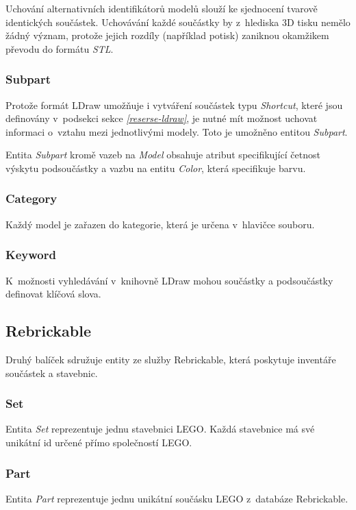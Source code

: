 Uchování alternativních identifikátorů modelů slouží ke sjednocení tvarově identických součástek. Uchovávání každé součástky by z~hlediska 3D tisku nemělo žádný význam, protože jejich rozdíly (například potisk) zaniknou okamžikem převodu do formátu \textit{STL}.

\subsubsection*{Subpart}
Protože formát LDraw umožňuje i vytváření součástek typu \textit{Shortcut}, které jsou definovány v~podsekci  sekce \emph{\ref{reserse-ldraw}}, je nutné mít možnost uchovat informaci o~vztahu mezi jednotlivými modely. Toto je umožněno entitou \textit{Subpart}. 

Entita \textit{Subpart} kromě vazeb na \textit{Model} obsahuje atribut specifikující četnost výskytu podsoučástky a vazbu na entitu \textit{Color}, která specifikuje barvu. 

\subsubsection*{Category}
Každý model je zařazen do kategorie, která je určena v~hlavičce souboru.

\subsubsection*{Keyword}
K~možnosti vyhledávání v~knihovně LDraw mohou součástky a podsoučástky definovat klíčová slova.

\subsection{Rebrickable}
Druhý balíček sdružuje entity ze služby Rebrickable, která poskytuje inventáře součástek a stavebnic.

\subsubsection*{Set}
Entita \textit{Set} reprezentuje jednu stavebnici LEGO. Každá stavebnice má své unikátní id určené přímo společností LEGO. 

\subsubsection*{Part}
Entita \textit{Part} reprezentuje jednu unikátní součásku LEGO z~databáze Rebrickable.

